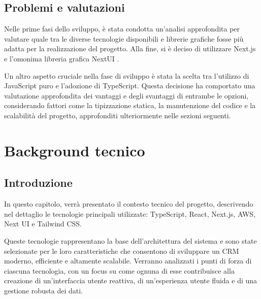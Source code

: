 \documentclass[target=bach,aauheader=,style=]{thud}
\begin{document}
\section{Problemi e valutazioni}
Nelle prime fasi dello sviluppo, è stata condotta un'analisi approfondita per valutare quale tra le diverse tecnologie disponibili e librerie grafiche fosse più adatta per la realizzazione del progetto. Alla fine, si è deciso di utilizzare Next.js \cite{nextjs2024} e l'omonima libreria grafica NextUI \cite{nextui2024}. 

\noindent Un altro aspetto cruciale nella fase di sviluppo è stata la scelta tra l'utilizzo di JavaScript puro e l'adozione di TypeScript. Questa decisione ha comportato una valutazione approfondita dei vantaggi e degli svantaggi di entrambe le opzioni, considerando fattori come la tipizzazione statica, la manutenzione del codice e la scalabilità del progetto, approfonditi ulteriormente nelle sezioni seguenti.


\chapter{Background tecnico}

\section{Introduzione}
In questo capitolo, verrà presentato il contesto tecnico del progetto, descrivendo nel dettaglio le tecnologie principali utilizzate: TypeScript, React, Next.js, AWS, Next UI e Tailwind CSS. 

\noindent Queste tecnologie rappresentano la base dell'architettura del sistema e sono state selezionate per le loro caratteristiche che consentono di sviluppare un CRM moderno, efficiente e altamente scalabile. Verranno analizzati i punti di forza di ciascuna tecnologia, con un focus su come ognuna di esse contribuisce alla creazione di un'interfaccia utente reattiva, di un'esperienza utente fluida e di una gestione robusta dei dati.
\end{document}
